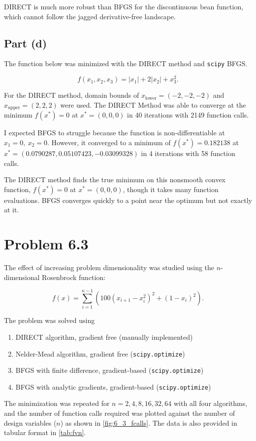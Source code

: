 \documentclass{article}
\begin{document}
DIRECT is much more robust than BFGS for the discontinuous bean function, which cannot follow the jagged derivative-free landscape. 

\subsection*{Part (d)}

The function below was minimized with the DIRECT method and \texttt{scipy} BFGS. 

\[
f(x_1, x_2, x_3) = |x_1| + 2|x_2| + x_3^2 .
\]

For the DIRECT method, domain bounds of $x_\text{lower} = (-2, -2, -2)$ and $x_\text{upper} = (2, 2, 2)$ were used. The DIRECT Method was able to converge at the minimum $f(x^*) = 0$ at $x^* = (0, 0, 0)$ in 40 iterations with 2149 function calls. 

I expected BFGS to struggle because the function is non-differentiable at $x_1 = 0, \ x_2 = 0$. However, it converged to a minimum of $f(x^*) = 0.182138$ at $x^* = (0.0790287, 0.05107423, -0.03099328)$  in 4 iterations with 58 function calls. 

The DIRECT method finds the true minimum on this nonsmooth convex function, $f(x^*) = 0$ at $x^* = (0, 0, 0)$, though it takes many function evaluations. BFGS converges quickly to a point near the optimum but not exactly at it.

\section*{Problem 6.3}

The effect of increasing problem dimensionality was studied using the $n$-dimensional Rosenbrock function: 

\[
f(x) = \sum_{i=1}^{n-1} \left( 100(x_{i+1} - x_i^2)^2 + (1 - x_i)^2 \right).
\]

The problem was solved using 
\begin{enumerate}
    \item DIRECT algorithm, gradient free (manually implemented) 
    \item Nelder-Mead algorithm, gradient free (\texttt{scipy.optimize})
    \item BFGS with finite difference, gradient-based (\texttt{scipy.optimize})
    \item BFGS with analytic gradients, gradient-based (\texttt{scipy.optimize})
\end{enumerate}

The minimization was repeated for $n = 2, 4, 8, 16, 32, 64$ with all four algorithms, and the number of function calls required was plotted against the number of design variables ($n$) as shown in \autoref{fig:6_3_fcalls}. The data is also provided in tabular format in \autoref{tab:fvn}.
\end{document}
